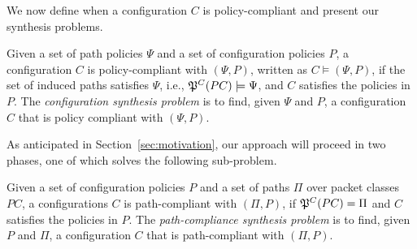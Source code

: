 



\noindent We now define when a configuration $C$ is policy-compliant
and present our synthesis problems.
\begin{definition} \label{def:policycompliance}
	Given a set of path policies $\Psi$ and a set of configuration policies $P$,
	a configuration $C$ is policy-compliant with $(\Psi,P)$,  
	written as $C \models (\Psi,P)$, if the set of
	induced paths satisfies $\Psi$, i.e., $\mathfrak{P}^C(PC) \models \Psi$,
	and $C$ satisfies the policies in $P$.
	The \emph{configuration synthesis problem} is to find, given $\Psi$ and $P$,
a configuration $C$ that is policy compliant with $(\Psi,P)$.
\end{definition}

As anticipated in Section~\ref{sec:motivation}, our approach will proceed in two phases,
one of which solves the following sub-problem.  
\begin{definition} \label{def:pathcompliance}
Given a set of configuration policies $P$
and a set of paths $\Pi$ over packet classes $PC$,
	a configurations $C$ is path-compliant with 
	$(\Pi,P)$,
	if $\mathfrak{P}^C(PC)=\Pi$ and $C$ satisfies the policies in $P$.
	The \emph{path-compliance synthesis problem} is to find, given $P$ and $\Pi$,
a configuration $C$ that is path-compliant with $(\Pi,P)$.
\end{definition}



